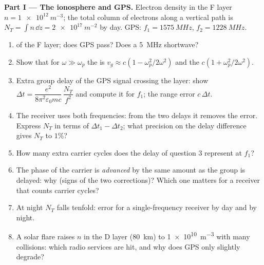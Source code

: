 \begin{problem}
\label{pb:b2:waves-in-media:1}

\medskip
\noindent\textbf{Part I --- The ionosphere and GPS.}
Electron density in the F layer $n = \qty{1e12}{m^{-3}}$; the total column of
electrons along a vertical path is $N_T = \int n\,\dd z = \qty{2e17}{m^{-2}}$ by
day. GPS: $f_1 = \qty{1575}{MHz}$, $f_2 = \qty{1228}{MHz}$.
\begin{enumerate}
  \item {} of the F layer; does GPS pass? Does a
        \qty{5}{MHz} shortwave?
  \item Show that for $\omega \gg \omega_p$ the  is $v_g \approx c(1 -
        \omega_p^2/2\omega^2)$ and the  $c(1 + \omega_p^2/2\omega^2)$.
  \item Extra group delay of the GPS signal crossing the layer: show
        $\Delta t = \dfrac{e^2}{8\pi^2\varepsilon_0mc}\,\dfrac{N_T}{f^2}$ and compute it for
        $f_1$; the range error $c\,\Delta t$.
  \item The receiver uses both frequencies: from the two delays it
        removes the error. Express $N_T$ in terms of $\Delta t_1 - \Delta t_2$;
        what precision on the delay difference gives $N_T$ to $1\%$?
  \item How many extra carrier cycles does the delay of question 3
        represent at $f_1$?
  \item The phase of the carrier is \emph{advanced} by the same
        amount as the group is delayed: why (signs of the two
        corrections)? Which one matters for a receiver that counts
        carrier cycles?
  \item At night $N_T$ falls tenfold: error for a single-frequency
        receiver by day and by night.
  \item A solar flare raises $n$ in the D layer (\qty{80}{km}) to
        \qty{1e10}{m^{-3}} with many collisions: which radio services are
        hit, and why does GPS only slightly degrade?
\end{enumerate}


\end{problem}

